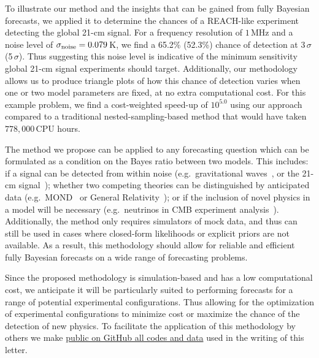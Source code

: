 \documentclass[twocolumn,english,aps,prl,amsmath,amssymb,reprint,footinbib,floatfix,showkeys]{revtex4-2}
\begin{document}
To illustrate our method and the insights that can be gained from fully Bayesian forecasts, we applied it to determine the chances of a REACH-like experiment detecting the global 21-cm signal.
For a frequency resolution of $1$\,MHz and a noise level of $\sigma_{\rm noise} = 0.079$\,K, we find a 65.2\% (52.3\%) chance of detection at 3\,$\sigma$ (5\,$\sigma$). 
Thus suggesting this noise level is indicative of the minimum sensitivity global 21-cm signal experiments should target. 
Additionally, our methodology allows us to produce triangle plots of how this chance of detection varies when one or two model parameters are fixed, at no extra computational cost. 
For this example problem, we find a cost-weighted speed-up of $10^{5.0}$ using our approach compared to a traditional nested-sampling-based method that would have taken $778,000$\,CPU hours.

The method we propose can be applied to any forecasting question which can be formulated as a condition on the Bayes ratio between two models. 
This includes: if a signal can be detected from within noise (e.g.\ gravitational waves~\citep{CosmicExplorer}, or the 21-cm signal~\citep{Furlanetto_2006}); whether two competing theories can be distinguished by anticipated data (e.g.\ MOND~\citep{MOND} or General Relativity~\citep{GR}); or if the inclusion of novel physics in a model will be necessary (e.g.\ neutrinos in CMB experiment analysis~\citep{Simons}). 
Additionally, the method only requires simulators of mock data, and thus can still be used in cases where closed-form likelihoods or explicit priors are not available. 
As a result, this methodology should allow for reliable and efficient fully Bayesian forecasts on a wide range of forecasting problems.

Since the proposed methodology is simulation-based and has a low computational cost, we anticipate it will be particularly suited to performing forecasts for a range of potential experimental configurations. 
Thus allowing for the optimization of experimental configurations to minimize cost or maximize the chance of the detection of new physics. 
To facilitate the application of this methodology by others we make \href{https://github.com/ThomasGesseyJones/FullyBayesianForecastsExample}{public on GitHub all codes and data} used in the writing of this letter. 
\end{document}

